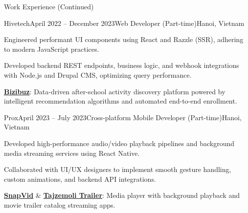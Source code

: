 \documentclass{resume}
\begin{document}
\begin{rSection}{Work Experience (Continued)}
    \begin{rSubsection}{Hivetech}{April 2022 -- December 2023}{Web Developer (Part-time)}{Hanoi, Vietnam}
      \item Engineered performant UI components using React and Razzle (SSR), adhering to modern JavaScript practices.
      \item Developed backend REST endpoints, business logic, and webhook integrations with Node.js and Drupal CMS, optimizing query performance.
      \rProjectsHeader
      \item \href{https://bizibuz.com/}{\textbf{Bizibuz}}: Data-driven after-school activity discovery platform powered by intelligent recommendation algorithms and automated end-to-end enrollment.
    \end{rSubsection}

    \begin{rSubsection}{Prox}{April 2023 -- July 2023}{Cross-platform Mobile Developer (Part-time)}{Hanoi, Vietnam}
      \item Developed high-performance audio/video playback pipelines and background media streaming services using React Native.
      \item Collaborated with UI/UX designers to implement smooth gesture handling, custom animations, and backend API integrations.
      \item \href{https://apps.apple.com/us/app/pure-tubi-mp3-player/id1658133343}{\textbf{SnapVid}} \& \href{https://apps.apple.com/vn/app/id1617873009}{\textbf{Tajzemoli Trailer}}: Media player with background playback and movie trailer catalog streaming apps.
    \end{rSubsection}
  \end{rSection}

  \newpage
\end{document}
